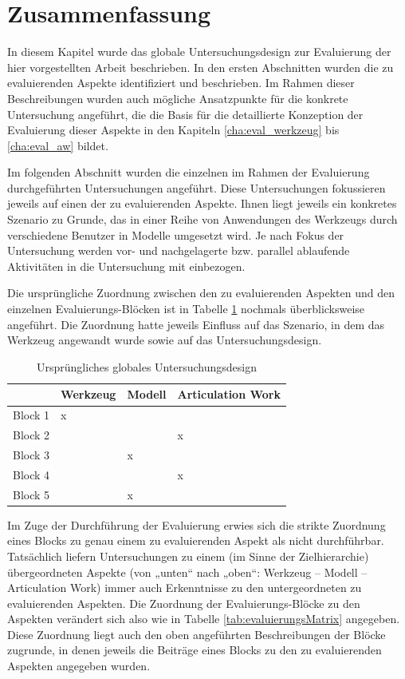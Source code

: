 \section{Zusammenfassung}
\label{sec:eval_ueberblick_zusammenfassung}

In diesem Kapitel wurde das globale Untersuchungsdesign zur Evaluierung der hier vorgestellten Arbeit beschrieben. In den ersten Abschnitten wurden die zu evaluierenden Aspekte identifiziert und beschrieben. Im Rahmen dieser Beschreibungen wurden auch mögliche Ansatzpunkte für die konkrete Untersuchung angeführt, die die Basis für die detaillierte Konzeption der Evaluierung dieser Aspekte in den Kapiteln \ref{cha:eval_werkzeug} bis \ref{cha:eval_aw} bildet. 

Im folgenden Abschnitt wurden die einzelnen im Rahmen der Evaluierung durchgeführten Untersuchungen angeführt. Diese Untersuchungen fokussieren jeweils auf einen der zu evaluierenden Aspekte. Ihnen liegt jeweils ein konkretes Szenario zu Grunde, das in einer Reihe von Anwendungen des Werkzeugs durch verschiedene Benutzer in Modelle umgesetzt wird. Je nach Fokus der Untersuchung werden vor- und nachgelagerte bzw. parallel ablaufende Aktivitäten in die Untersuchung mit einbezogen.

Die ursprüngliche Zuordnung zwischen den zu evaluierenden Aspekten und den einzelnen Evaluierungs-Blöcken ist in Tabelle \ref{tab:evaluierungsMatrixOriginal} nochmals überblicksweise angeführt. Die Zuordnung hatte jeweils Einfluss auf das Szenario, in dem das Werkzeug angewandt wurde sowie auf das Untersuchungsdesign.

\begin{table}[htbp]
	\centering
	\caption{Ursprüngliches globales Untersuchungsdesign}
	\begin{tabular}{| p{3cm} || p{2cm} | p{2cm} | p{2cm} |} \hline
		 & Werkzeug & Modell & Articulation Work \\ \hline \hline
		 Block 1 & x &  &   \\ \hline
		 Block 2 &  &  & x  \\ \hline
		 Block 3 &  & x &   \\ \hline
		 Block 4 &  &  & x  \\ \hline
		 Block 5 &  & x &   \\ \hline
	\end{tabular}
	\label{tab:evaluierungsMatrixOriginal}
\end{table}

Im Zuge der Durchführung der Evaluierung erwies sich die strikte Zuordnung eines Blocks zu genau einem zu evaluierenden Aspekt als nicht durchführbar. Tatsächlich liefern Untersuchungen zu einem (im Sinne der Zielhierarchie) übergeordneten Aspekte (von „unten“ nach „oben“: Werkzeug -- Modell -- Articulation Work) immer auch Erkenntnisse zu den untergeordneten zu evaluierenden Aspekten. Die Zuordnung der Evaluierungs-Blöcke zu den Aspekten verändert sich also wie in Tabelle \ref{tab:evaluierungsMatrix} angegeben. Diese Zuordnung liegt auch den oben angeführten Beschreibungen der Blöcke zugrunde, in denen jeweils die Beiträge eines Blocks zu den zu evaluierenden Aspekten angegeben wurden.

